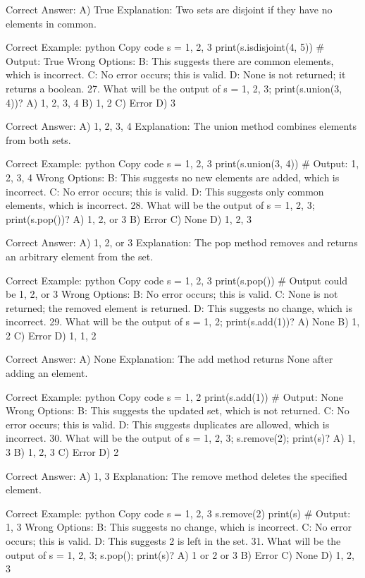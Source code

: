 Correct Answer: A) True
Explanation: Two sets are disjoint if they have no elements in common.

Correct Example:
python
Copy code
s = {1, 2, 3}
print(s.isdisjoint({4, 5}))  # Output: True
Wrong Options:
B: This suggests there are common elements, which is incorrect.
C: No error occurs; this is valid.
D: None is not returned; it returns a boolean.
27. What will be the output of s = {1, 2, 3}; print(s.union({3, 4}))?
A) {1, 2, 3, 4}
B) {1, 2}
C) Error
D) {3}

Correct Answer: A) {1, 2, 3, 4}
Explanation: The union method combines elements from both sets.

Correct Example:
python
Copy code
s = {1, 2, 3}
print(s.union({3, 4}))  # Output: {1, 2, 3, 4}
Wrong Options:
B: This suggests no new elements are added, which is incorrect.
C: No error occurs; this is valid.
D: This suggests only common elements, which is incorrect.
28. What will be the output of s = {1, 2, 3}; print(s.pop())?
A) 1, 2, or 3
B) Error
C) None
D) {1, 2, 3}

Correct Answer: A) 1, 2, or 3
Explanation: The pop method removes and returns an arbitrary element from the set.

Correct Example:
python
Copy code
s = {1, 2, 3}
print(s.pop())  # Output could be 1, 2, or 3
Wrong Options:
B: No error occurs; this is valid.
C: None is not returned; the removed element is returned.
D: This suggests no change, which is incorrect.
29. What will be the output of s = {1, 2}; print(s.add(1))?
A) None
B) {1, 2}
C) Error
D) {1, 1, 2}

Correct Answer: A) None
Explanation: The add method returns None after adding an element.

Correct Example:
python
Copy code
s = {1, 2}
print(s.add(1))  # Output: None
Wrong Options:
B: This suggests the updated set, which is not returned.
C: No error occurs; this is valid.
D: This suggests duplicates are allowed, which is incorrect.
30. What will be the output of s = {1, 2, 3}; s.remove(2); print(s)?
A) {1, 3}
B) {1, 2, 3}
C) Error
D) {2}

Correct Answer: A) {1, 3}
Explanation: The remove method deletes the specified element.

Correct Example:
python
Copy code
s = {1, 2, 3}
s.remove(2)
print(s)  # Output: {1, 3}
Wrong Options:
B: This suggests no change, which is incorrect.
C: No error occurs; this is valid.
D: This suggests 2 is left in the set.
31. What will be the output of s = {1, 2, 3}; s.pop(); print(s)?
A) {1} or {2} or {3}
B) Error
C) None
D) {1, 2, 3}

